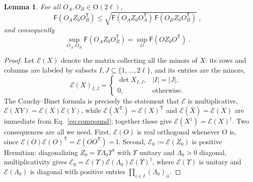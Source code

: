 \documentclass[prx,twocolumn,superscriptaddress,aps,10pt, frontmatterverbose, reprint,footinbib,longbibliography=true]{revtex4-2}
\newtheorem{lemma}{Lemma}
\newcommand{\trans}{\mathsf{T}}
\begin{document}
\begin{lemma}
\label{lem:two-to-one}
For all $O_A,O_B\in \mathrm{O}(2\ell)$,
\begin{equation}
    \mathsf{F}\!\left(O_AZ_0O_B^{\trans}\right)\le\sqrt{\mathsf{F}\!\left(O_AZ_0O_A^{\trans}\right)\,\mathsf{F}\!\left(O_BZ_0O_B^{\trans}\right)}\;,
    \label{eq:two-to-one}
\end{equation}
and consequently
\begin{equation}
    \sup_{O_A,O_B}\mathsf{F}\!\left(O_AZ_0O_B^{\trans}\right)=\sup_{O}\mathsf{F}\!\left(OZ_0O^{\trans}\right)\;.
    \label{eq:sup-two-to-one}
\end{equation}
\end{lemma}

\begin{proof}
Let $\mathcal{E}(X)$ denote the matrix collecting all the minors of $X$: its rows and columns are labeled by subsets $I,J\subseteq \{1,\dots,2\ell\}$, and its entries are the minors,
\begin{equation}
    \mathcal{E}(X)_{I,J}=\begin{cases}\det X_{I,J}, & |I|=|J|,\\ 0,&\text{otherwise.}\end{cases}
    \label{eq:compound}
\end{equation}
The Cauchy--Binet formula is precisely the statement that $\mathcal{E}$ is multiplicative, $\mathcal{E}(XY)=\mathcal{E}(X)\mathcal{E}(Y)$, while $\mathcal{E}(X^{\trans})=\mathcal{E}(X)^{\trans}$ and $\mathcal{E}(\overline X)=\overline{\mathcal{E}(X)}$ are immediate from Eq.~\eqref{eq:compound}; together these give $\mathcal{E}(X^\dagger)=\mathcal{E}(X)^\dagger$. Two consequences are all we need. First, $\mathcal{E}(O)$ is real orthogonal whenever $O$ is, since $\mathcal{E}(O)\mathcal{E}(O)^{\trans}=\mathcal{E}(OO^{\trans})=\mathbb{I}$. Second, $\mathcal{E}_0:=\mathcal{E}(Z_0)$ is positive Hermitian: diagonalizing $Z_0=\Upsilon\Lambda_0\Upsilon^\dagger$ with $\Upsilon$ unitary and $\Lambda_0>0$  diagonal, multiplicativity gives $\mathcal{E}_0=\mathcal{E}(\Upsilon)\mathcal{E}(\Lambda_0)\mathcal{E}(\Upsilon)^\dagger$, where $\mathcal{E}(\Upsilon)$  is unitary and $\mathcal{E}(\Lambda_0)$ is diagonal with positive entries $\prod_{i\in I}(\Lambda_0)_{ii}$.



\end{proof}
\end{document}
